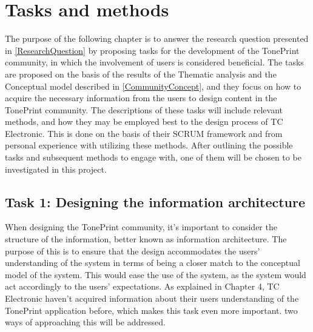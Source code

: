 \chapter{Tasks and methods}
\label{TaskAndMethods}
The purpose of the following chapter is to answer the research question presented in \autoref{ResearchQuestion} by proposing tasks for the development of the TonePrint community, in which the involvement of users is considered beneficial. The tasks are proposed on the basis of the results of the Thematic analysis and the Conceptual model described in \autoref{CommunityConcept}, and they focus on how to acquire the necessary information from the users to design content in the TonePrint community. The descriptions of these tasks will include relevant methods, and how they may be employed best to the design process of TC Electronic. This is done on the basis of their SCRUM framework and from personal experience with utilizing these methods. After outlining the possible tasks and subsequent methods to engage with, one of them will be chosen to be investigated in this project.


\section{Task 1: Designing the information architecture}
\label{Task1}
When designing the TonePrint community, it's important to consider the structure of the information, better known as information architecture. The purpose of this is to ensure that the design accommodates the users' understanding of the system in terms of being a closer match to the conceptual model of the system. This would ease the use of the system, as the system would act accordingly to the users' expectations. As explained in Chapter 4, TC Electronic haven't acquired information about their users understanding of the TonePrint application before, which makes this task even more important. two ways of approaching this will be addressed. \\

